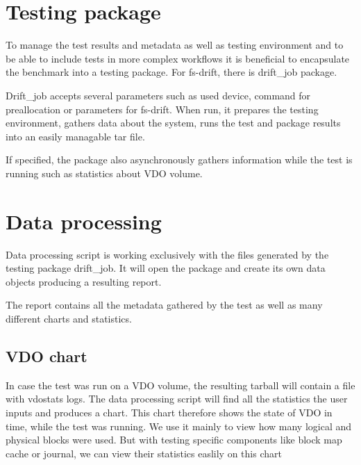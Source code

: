 \documentclass[
  color, %
  table, %
  lof,   %
  lot,   %
]{fithesis3}
\begin{document}
\section{Testing package}
To manage the test results and metadata as well as testing environment and to be able to include tests in more complex workflows it is beneficial to encapsulate the benchmark into a testing package. For fs-drift, there is drift\_job package.

Drift\_job accepts several parameters such as used device, command for preallocation or parameters for fs-drift. When run, it prepares the testing environment, gathers data about the system, runs the test and package results into an easily managable tar file.

If specified, the package also asynchronously gathers information while the test is running such as statistics about VDO volume.



\section{Data processing}
Data processing script is working exclusively with the files generated by the testing package drift\_job. It will open the package and create its own data objects producing a resulting report.

The report contains all the metadata gathered by the test as well as many different charts and statistics.

\subsection{VDO chart}
In case the test was run on a VDO volume, the resulting tarball will contain a file with vdostats logs. The data processing script will find all the statistics the user inputs and produces a chart. This chart therefore shows the state of VDO in time, while the test was running. We use it mainly to view how many logical and physical blocks were used. But with testing specific components like block map cache or journal, we can view their statistics easlily on this chart
\end{document}
